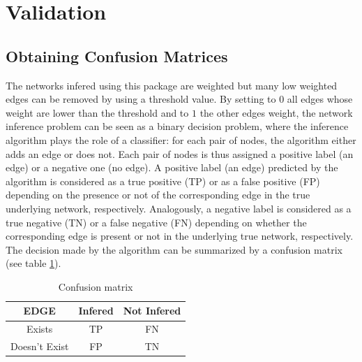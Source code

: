\documentclass{article}
\begin{document}
\section{Validation}

\subsection{Obtaining Confusion Matrices}
The networks infered using this package are weighted but many
low weighted edges can be removed by using a threshold value. 
By setting to $0$ all edges whose weight are lower than the threshold
and to $1$ the other edges weight, the network inference problem 
can be seen as a binary decision problem, where the inference algorithm 
plays the role of a classifier: for each pair of nodes, the algorithm 
either adds an edge or does not. Each pair of nodes is thus assigned a
positive label (an edge) or a negative one (no edge).
    A positive label (an edge) predicted by the algorithm is
considered as a true positive (TP) or as a false positive (FP)
depending on the presence or not of the corresponding edge
in the true underlying network, respectively. Analogously, a
negative label is considered as a true negative (TN) or a false
negative (FN) depending on whether the corresponding edge
is present or not in the underlying true network, respectively.
    The decision made by the algorithm can be summarized
by a confusion matrix (see table \ref{tab:confusion}).
\begin{table}
\label{tab:confusion}
\begin{center}\begin{tabular}{c|cc}
\scriptsize{\bf EDGE}	& Infered & Not Infered \tabularnewline\hline
Exists			&	TP	   &    FN	\tabularnewline
Doesn't Exist     &   FP	   &    TN	\tabularnewline 
\end{tabular}\end{center}
\caption{Confusion matrix}
\end{table}
\end{document}
